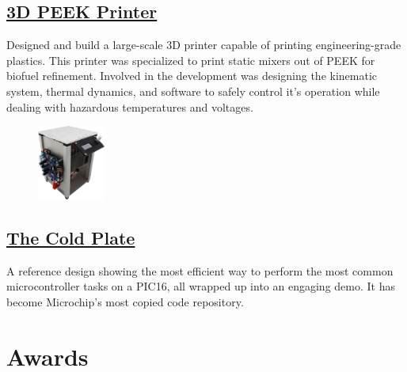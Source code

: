 \documentclass[
	10pt, %
]{FreemanCV}
\begin{document}
\begin{paracol}{2}
\vspace*{-10pt} %
\leavevmode\subsection{\href{https://github.com/jfcbooth/3dpp}{3D PEEK Printer \scriptsize\faLink}}

Designed and build a large-scale 3D printer capable of printing engineering-grade plastics.
This printer was specialized to print static mixers out of PEEK for biofuel refinement.
Involved in the development was designing the kinematic system, thermal dynamics, and software to safely control it's operation
while dealing with hazardous temperatures and voltages.


\setlength\intextsep{20pt} %
\begin{figure} %
    \includegraphics[width=63pt]{cold_plate} %
\end{figure}

\leavevmode \subsection{\href{https://github.com/microchip-pic-avr-examples/pic16f17146-cold-plate-mplab-mcc}{The Cold Plate \scriptsize\faLink}}

A reference design showing the most efficient way to perform the most common microcontroller tasks on a PIC16, all wrapped up into an engaging demo.
It has become Microchip's most copied code repository.



\section{Awards}


\end{paracol}
\end{document}
